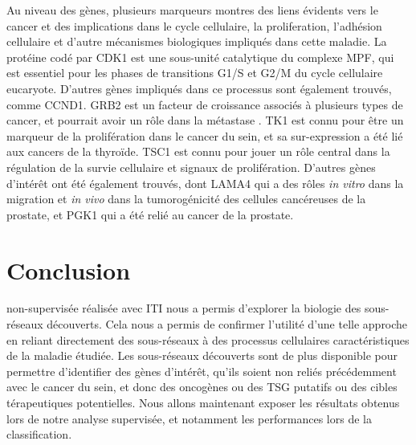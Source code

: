 		Au niveau des gènes, plusieurs marqueurs montres des liens évidents vers le cancer et des implications dans le cycle cellulaire, la proliferation, l'adhésion cellulaire et d'autre mécanismes biologiques impliqués dans cette maladie.
		La protéine codé par \acs{CDK1} est une sous-unité catalytique du complexe \acs{MPF}, qui est essentiel pour les phases de transitions G1/S et G2/M du cycle cellulaire eucaryote.
		D'autres gènes impliqués dans ce processus sont également trouvés, comme \acs{CCND1}.
		\acs{GRB2} est un facteur de croissance associés à plusieurs types de cancer, et pourrait avoir un rôle dans la métastase \citet{Yu2008}.
		\acs{TK1} est connu pour être un marqueur de la prolifération dans le cancer du sein, et sa sur-expression a été lié aux cancers de la thyroïde.
		\acs{TSC1} est connu pour jouer un rôle central dans la régulation de la survie cellulaire et signaux de prolifération.
		D'autres gènes d'intérêt ont été également trouvés, dont \acs{LAMA4} qui a des rôles \emph{in vitro} dans la migration et \emph{in vivo} dans la tumorogénicité des cellules cancéreuses de la prostate, et \acs{PGK1} qui a été relié au cancer de la prostate.

\pagebreak

	\section{\textcolor{green!45!black}{{Conclusion}}}
		 non-supervisée réalisée avec ITI nous a permis d'explorer la biologie des sous-réseaux découverts.
		Cela nous a permis de confirmer l'utilité d'une telle approche en reliant directement des sous-réseaux à des processus cellulaires caractéristiques de la maladie étudiée.
		Les sous-réseaux découverts sont de plus disponible pour permettre d'identifier des gènes d'intérêt, qu'ils soient non reliés précédemment avec le cancer du sein, et donc des oncogènes ou des \acs{TSG} putatifs ou des cibles térapeutiques potentielles.
		Nous allons maintenant exposer les résultats obtenus lors de notre analyse supervisée, et notamment les performances lors de la classification.
		